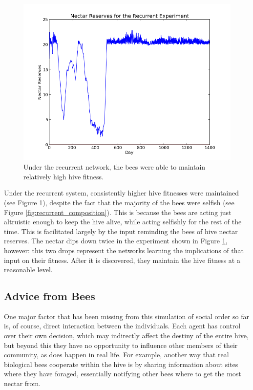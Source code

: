 \documentclass[11pt, letter]{article}
\begin{document}
			\begin{figure}[tbph!]
				\begin{center}
					\includegraphics[scale=.5]{results/recurrent_res.png}
				\end{center}
				\caption{Under the recurrent network, the bees were able to maintain relatively high hive fitness.}
				\label{fig:recurrent_reserves}
			\end{figure}

			Under the recurrent system, consistently higher hive fitnesses were maintained (see Figure \ref{fig:recurrent_reserves}), despite the fact that the majority of the bees were selfish (see Figure \ref{fig:recurrent_composition}). This is because the bees are acting just altruistic enough to keep the hive alive, while acting selfishly for the rest of the time. This is facilitated largely by the input reminding the bees of hive nectar reserves. The nectar dips down twice in the experiment shown in Figure \ref{fig:recurrent_reserves}, however: this two drops represent the networks learning the implications of that input on their fitness. After it is discovered, they maintain the hive fitness at a reasonable level.

		\subsection{Advice from Bees} %
		\label{sub:advice_from_bees}

			One major factor that has been missing from this simulation of social order so far is, of course, direct interaction between the individuals. Each agent has control over their own decision, which may indirectly affect the destiny of the entire hive, but beyond this they have no opportunity to influence other members of their community, as does happen in real life. For example, another way that real biological bees cooperate within the hive is by sharing information about sites where they have foraged, essentially notifying other bees where to get the most nectar from. 
\end{document}
